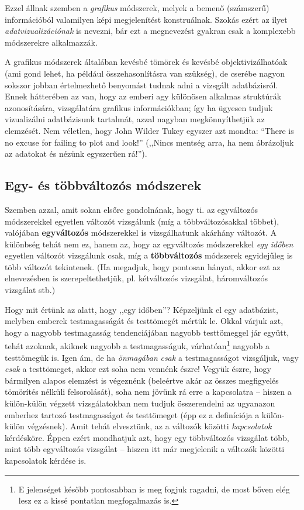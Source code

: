 \documentclass[]{book}
\let\rmarkdownfootnote\footnote%
\def\footnote{\protect\rmarkdownfootnote}
\begin{document}
Ezzel állnak szemben a \emph{grafikus} módszerek, melyek a bemenő (számszerű) információból valamilyen képi megjelenítést konstruálnak. Szokás ezért az ilyet \emph{adatvizualizációnak} is nevezni, bár ezt a megnevezést gyakran csak a komplexebb módszerekre alkalmazzák.

A grafikus módszerek általában kevésbé tömörek és kevésbé objektivizálhatóak (ami gond lehet, ha például összehasonlításra van szükség), de cserébe nagyon sokszor jobban értelmezhető benyomást tudnak adni a vizsgált adatbázisról. Ennek hátterében az van, hogy az emberi agy különösen alkalmas struktúrák azonosítására, vizsgálatára grafikus információkban; így ha ügyesen tudjuk vizualizálni adatbázisunk tartalmát, azzal nagyban megkönnyíthetjük az elemzését. Nem véletlen, hogy John Wilder Tukey egyszer azt mondta: ``There is no excuse for failing to plot and look!'' (,,Nincs mentség arra, ha nem ábrázoljuk az adatokat és nézünk egyszerűen rá!'').

\hypertarget{deskriptivcsoportositasegytobbvalt}{%
\subsection{Egy- és többváltozós módszerek}\label{deskriptivcsoportositasegytobbvalt}}

Szemben azzal, amit sokan elsőre gondolnának, hogy ti. az egyváltozós módszerekkel egyetlen változót vizsgálunk (míg a többváltozósakkal többet), valójában \textbf{egyváltozós} módszerekkel is vizsgálhatunk akárhány változót. A különbség tehát nem ez, hanem az, hogy az egyváltozós módszerekkel \emph{egy időben} egyetlen változót vizsgálunk csak, míg a \textbf{többváltozós} módszerek egyidejűleg is több változót tekintenek. (Ha megadjuk, hogy pontosan hányat, akkor ezt az elnevezésben is szerepeltethetjük, pl. kétváltozós vizsgálat, háromváltozós vizsgálat stb.)

Hogy mit értünk az alatt, hogy ,,egy időben''? Képzeljünk el egy adatbázist, melyben emberek testmagasságát és testtömegét mértük le. Okkal várjuk azt, hogy a nagyobb testmagasság tendenciájában nagyobb testtömeggel jár együtt, tehát azoknak, akiknek nagyobb a testmagasságuk, várhatóan\footnote{E jelenséget később pontosabban is meg fogjuk ragadni, de most bőven elég lesz ez a kissé pontatlan megfogalmazás is.} nagyobb a testtömegük is. Igen ám, de ha \emph{önmagában} \emph{csak} a testmagasságot vizsgáljuk, vagy \emph{csak} a testtömeget, akkor ezt soha nem vennénk észre! Vegyük észre, hogy bármilyen alapos elemzést is végeznénk (beleértve akár az összes megfigyelés tömörítés nélküli felsorolását), soha nem jövünk rá erre a kapcsolatra -- hiszen a külön-külön végzett vizsgálatokban nem tudjuk összerendelni az ugyanazon emberhez tartozó testmagasságot és testtömeget (épp ez a definíciója a külön-külön végzésnek). Amit tehát elvesztünk, az a változók közötti \emph{kapcsolatok} kérdésköre. Éppen ezért mondhatjuk azt, hogy egy többváltozós vizsgálat több, mint több egyváltozós vizsgálat -- hiszen itt már megjelenik a változók közötti kapcsolatok kérdése is.
\end{document}
